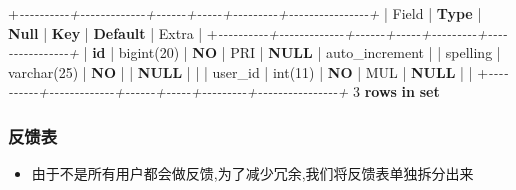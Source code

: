 \documentclass[
]{article}
\newenvironment{Shaded}{}{}
\newcommand{\CommentTok}[1]{\textcolor[rgb]{0.38,0.63,0.69}{\textit{#1}}}
\newcommand{\DataTypeTok}[1]{\textcolor[rgb]{0.56,0.13,0.00}{#1}}
\newcommand{\DecValTok}[1]{\textcolor[rgb]{0.25,0.63,0.44}{#1}}
\newcommand{\KeywordTok}[1]{\textcolor[rgb]{0.00,0.44,0.13}{\textbf{#1}}}
\newcommand{\NormalTok}[1]{#1}
\newcommand{\OperatorTok}[1]{\textcolor[rgb]{0.40,0.40,0.40}{#1}}
\begin{document}
\begin{Shaded}
\begin{Highlighting}[]
\OperatorTok{+}\CommentTok{{-}{-}{-}{-}{-}{-}{-}{-}{-}{-}+{-}{-}{-}{-}{-}{-}{-}{-}{-}{-}{-}{-}{-}+{-}{-}{-}{-}{-}{-}+{-}{-}{-}{-}{-}+{-}{-}{-}{-}{-}{-}{-}{-}{-}+{-}{-}{-}{-}{-}{-}{-}{-}{-}{-}{-}{-}{-}{-}{-}{-}+}
\NormalTok{| Field    | }\KeywordTok{Type}\NormalTok{        | }\KeywordTok{Null}\NormalTok{ | }\KeywordTok{Key}\NormalTok{ | }\KeywordTok{Default}\NormalTok{ | Extra          |}
\OperatorTok{+}\CommentTok{{-}{-}{-}{-}{-}{-}{-}{-}{-}{-}+{-}{-}{-}{-}{-}{-}{-}{-}{-}{-}{-}{-}{-}+{-}{-}{-}{-}{-}{-}+{-}{-}{-}{-}{-}+{-}{-}{-}{-}{-}{-}{-}{-}{-}+{-}{-}{-}{-}{-}{-}{-}{-}{-}{-}{-}{-}{-}{-}{-}{-}+}
\NormalTok{| }\KeywordTok{id}\NormalTok{       | bigint(}\DecValTok{20}\NormalTok{)  | }\KeywordTok{NO}\NormalTok{   | PRI | }\KeywordTok{NULL}\NormalTok{    | auto\_increment |}
\NormalTok{| spelling | }\DataTypeTok{varchar}\NormalTok{(}\DecValTok{25}\NormalTok{) | }\KeywordTok{NO}\NormalTok{   |     | }\KeywordTok{NULL}\NormalTok{    |                |}
\NormalTok{| user\_id  | }\DataTypeTok{int}\NormalTok{(}\DecValTok{11}\NormalTok{)     | }\KeywordTok{NO}\NormalTok{   | MUL | }\KeywordTok{NULL}\NormalTok{    |                |}
\OperatorTok{+}\CommentTok{{-}{-}{-}{-}{-}{-}{-}{-}{-}{-}+{-}{-}{-}{-}{-}{-}{-}{-}{-}{-}{-}{-}{-}+{-}{-}{-}{-}{-}{-}+{-}{-}{-}{-}{-}+{-}{-}{-}{-}{-}{-}{-}{-}{-}+{-}{-}{-}{-}{-}{-}{-}{-}{-}{-}{-}{-}{-}{-}{-}{-}+}
\DecValTok{3} \KeywordTok{rows} \KeywordTok{in} \KeywordTok{set}
\end{Highlighting}
\end{Shaded}

\hypertarget{ux53cdux9988ux8868}{%
\subsubsection{反馈表}\label{ux53cdux9988ux8868}}

\begin{itemize}
\item
  由于不是所有用户都会做反馈,为了减少冗余,我们将反馈表单独拆分出来
\end{itemize}
\end{document}

